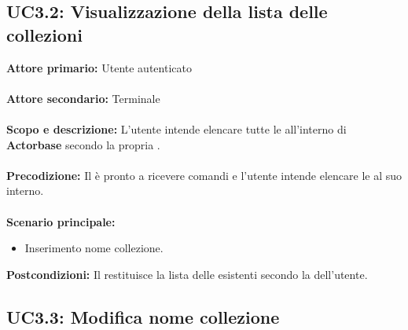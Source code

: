 \documentclass{scalatekids-article}
\begin{document}
\subsection{UC3.2: Visualizzazione della lista delle collezioni}

\textbf{Attore primario:} Utente autenticato\\ \\
\textbf{Attore secondario:} Terminale\\ \\
\textbf{Scopo e descrizione:} L'utente intende elencare tutte le  all'interno di \textbf{Actorbase} secondo la propria .\\ \\
\textbf{Precodizione:} Il  è pronto a ricevere comandi e l'utente intende elencare le  al suo interno.\\ \\
\textbf{Scenario principale:}
\begin{itemize}
\item Inserimento nome collezione.
\end{itemize}
\textbf{Postcondizioni:} Il  restituisce la lista delle  esistenti secondo la  dell'utente.

\subsection{UC3.3: Modifica nome collezione}
\end{document}
